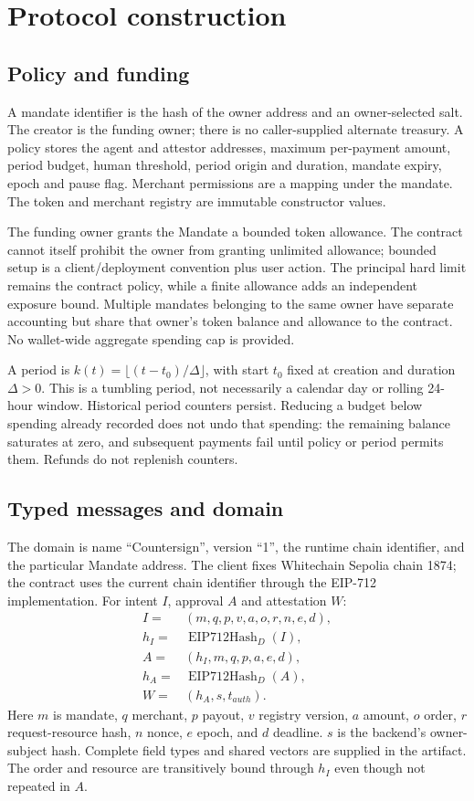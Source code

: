 \documentclass[11pt]{article}
\begin{document}



\section{Protocol construction}
\subsection{Policy and funding}
A mandate identifier is the hash of the owner address and an owner-selected salt. The creator is the funding owner; there is no caller-supplied alternate treasury. A policy stores the agent and attestor addresses, maximum per-payment amount, period budget, human threshold, period origin and duration, mandate expiry, epoch and pause flag. Merchant permissions are a mapping under the mandate. The token and merchant registry are immutable constructor values.

The funding owner grants the Mandate a bounded token allowance. The contract cannot itself prohibit the owner from granting unlimited allowance; bounded setup is a client/deployment convention plus user action. The principal hard limit remains the contract policy, while a finite allowance adds an independent exposure bound. Multiple mandates belonging to the same owner have separate accounting but share that owner's token balance and allowance to the contract. No wallet-wide aggregate spending cap is provided.

A period is $k(t)=\lfloor(t-t_0)/\Delta\rfloor$, with start $t_0$ fixed at creation and duration $\Delta>0$. This is a tumbling period, not necessarily a calendar day or rolling 24-hour window. Historical period counters persist. Reducing a budget below spending already recorded does not undo that spending: the remaining balance saturates at zero, and subsequent payments fail until policy or period permits them. Refunds do not replenish counters.

\subsection{Typed messages and domain}
The domain is name ``Countersign'', version ``1'', the runtime chain identifier, and the particular Mandate address. The client fixes Whitechain Sepolia chain 1874; the contract uses the current chain identifier through the EIP-712 implementation. For intent $I$, approval $A$ and attestation $W$:
\begin{align*}
I={}&(m,q,p,v,a,o,r,n,e,d),\\
h_I={}&\operatorname{EIP712Hash}_{D}(I),\\
A={}&(h_I,m,q,p,a,e,d),\\
h_A={}&\operatorname{EIP712Hash}_{D}(A),\\
W={}&(h_A,s,t_{auth}).
\end{align*}
Here $m$ is mandate, $q$ merchant, $p$ payout, $v$ registry version, $a$ amount, $o$ order, $r$ request-resource hash, $n$ nonce, $e$ epoch, and $d$ deadline. $s$ is the backend's owner-subject hash. Complete field types and shared vectors are supplied in the artifact. The order and resource are transitively bound through $h_I$ even though not repeated in $A$.
\end{document}
